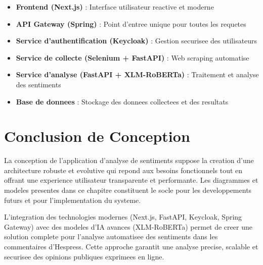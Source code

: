 \begin{itemize}
    \item \textbf{Frontend (Next.js)} : Interface utilisateur reactive et moderne
    \item \textbf{API Gateway (Spring)} : Point d'entree unique pour toutes les requetes
    \item \textbf{Service d'authentification (Keycloak)} : Gestion securisee des utilisateurs
    \item \textbf{Service de collecte (Selenium + FastAPI)} : Web scraping automatise
    \item \textbf{Service d'analyse (FastAPI + XLM-RoBERTa)} : Traitement et analyse des sentiments
    \item \textbf{Base de donnees} : Stockage des donnees collectees et des resultats
\end{itemize}

\section{Conclusion de Conception}

La conception de l'application d'analyse de sentiments suppose la creation d'une architecture robuste et evolutive qui repond aux besoins fonctionnels tout en offrant une experience utilisateur transparente et performante. Les diagrammes et modeles presentes dans ce chapitre constituent le socle pour les developpements futurs et pour l'implementation du systeme.

L'integration des technologies modernes (Next.js, FastAPI, Keycloak, Spring Gateway) avec des modeles d'IA avances (XLM-RoBERTa) permet de creer une solution complete pour l'analyse automatisee des sentiments dans les commentaires d'Hespress. Cette approche garantit une analyse precise, scalable et securisee des opinions publiques exprimees en ligne.

